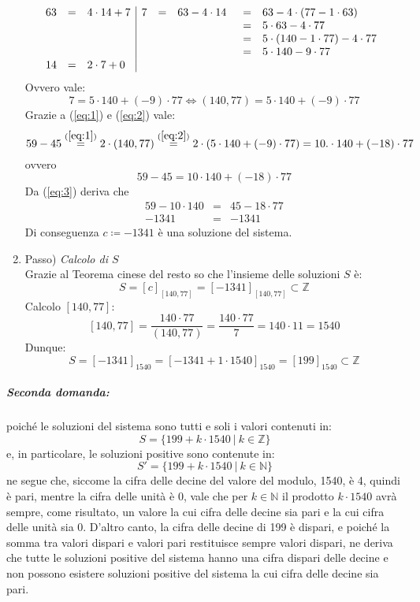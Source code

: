 \documentclass[12pt, a4paper]{report}
\theoremstyle{definition}
\begin{document}
\begin{enumerate}[label={\arabic*$^o$}]
\[\begin{array}{rcl|rcl}
        63 &= &4\cdot14+7 & 7 &= &63-4\cdot14\begin{array}[t]{rcl}
            &= &63-4\cdot(77-1\cdot63)\\
            &= &5\cdot63-4\cdot77\\
            &= &5\cdot(140-1\cdot77)-4\cdot77\\
            &= &5\cdot140-9\cdot77
        \end{array}\\
        14 &= &2\cdot7+0
    \end{array}\]
    Ovvero vale:
    \begin{equation}\label{eq:2}
        7=5\cdot140+(-9)\cdot77\Leftrightarrow(140,77)=5\cdot140+(-9)\cdot77
    \end{equation}
    Grazie a (\ref{eq:1}) e (\ref{eq:2}) vale:
    \[59-45\overset{(\ref{eq:1})}{=}2\cdot(140,77)\overset{(\ref{eq:2})}{=}2\cdot
    (5\cdot140+(-9)\cdot77)=10.\cdot140+(-18)\cdot77\]
    ovvero
    \begin{equation}\label{eq:3}
        59-45=10\cdot140+(-18)\cdot77
    \end{equation}
    Da (\ref{eq:3}) deriva che
    \[\begin{array}{rcl}
        59-10\cdot140 &= &45-18\cdot77\\
        -1341 &= &-1341
    \end{array}\]
    Di conseguenza $c\coloneqq-1341$ è una soluzione del sistema.
    \item Passo) \emph{Calcolo di $S$}\\
    Grazie al Teorema cinese del resto so che l'insieme delle soluzioni $S$ è:
    \[S=[c]_{[140,77]}=[-1341]_{[140,77]}\subset\mathbb{Z}\]
    Calcolo $[140,77]$:
    \[[140,77]=\frac{140\cdot77}{(140,77)}=\frac{140\cdot77}{7}=140\cdot11=1540\]
    Dunque:
    \[S=[-1341]_{1540}=[-1341+1\cdot1540]_{1540}=[199]_{1540}\subset\mathbb{Z}\]
\end{enumerate}
\subparagraph{Seconda domanda:}
poiché le soluzioni del sistema sono tutti e soli i valori contenuti in:
\[S=\{199+k\cdot1540\ |\ k\in\mathbb{Z}\}\]
e, in particolare, le soluzioni positive sono contenute in:
\[S'=\{199+k\cdot1540\ |\ k\in\mathbb{N}\}\]
ne segue che, siccome la cifra delle decine del valore del modulo, 1540, è 4,
quindi è pari, mentre la cifra delle unità è 0, vale che per $k\in\mathbb{N}$ il
prodotto $k\cdot1540$ avrà sempre, come risultato, un valore la cui cifra delle
decine sia pari e la cui cifra delle unità sia 0. D'altro canto, la cifra delle
decine di 199 è dispari, e poiché la somma tra valori dispari e valori pari
restituisce sempre valori dispari, ne deriva che tutte le soluzioni positive del
sistema hanno una cifra dispari delle decine e non possono esistere soluzioni
positive del sistema la cui cifra delle decine sia pari.
\end{document}
